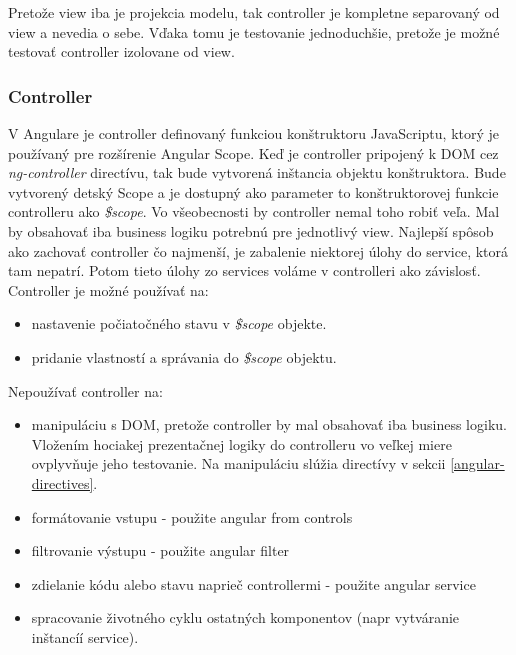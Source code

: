 Pretože view iba je projekcia modelu, tak controller je kompletne separovaný od view a nevedia o sebe. Vďaka tomu je testovanie jednoduchšie, pretože je možné testovať controller izolovane od view.\cite{angular-docs}

\subsubsection{Controller}
V Angulare je controller definovaný funkciou konštruktoru JavaScriptu, ktorý je používaný pre rozšírenie Angular Scope.
Keď je controller pripojený k DOM cez \textit{ng-controller} directívu, tak bude vytvorená inštancia objektu konštruktora. Bude vytvorený detský Scope a je dostupný ako parameter to konštruktorovej funkcie controlleru ako \textit{\$scope}.
Vo všeobecnosti by controller nemal toho robiť veľa. Mal by obsahovať iba business logiku potrebnú pre jednotlivý view. Najlepší spôsob ako zachovať controller čo najmenší, je zabalenie niektorej úlohy do service, ktorá tam nepatrí. Potom tieto úlohy zo services voláme v controlleri ako závislosť.\cite{angular-docs}\\

Controller je možné používať na:
\begin{itemize}
\item nastavenie počiatočného stavu v \textit{\$scope} objekte.
\item pridanie vlastností a správania do \textit{\$scope} objektu.
\end{itemize}

Nepoužívať controller na:
\begin{itemize}
\item manipuláciu s DOM, pretože controller by mal obsahovať iba business logiku. Vložením hociakej prezentačnej logiky do controlleru vo veľkej miere ovplyvňuje jeho testovanie. Na manipuláciu slúžia directívy v sekcii \ref{angular-directives}.
\item formátovanie vstupu - použite angular from controls
\item filtrovanie výstupu - použite angular filter
\item zdielanie kódu alebo stavu naprieč controllermi - použite angular service
\item spracovanie životného cyklu ostatných komponentov (napr vytváranie inštancíí service).
\end{itemize}

